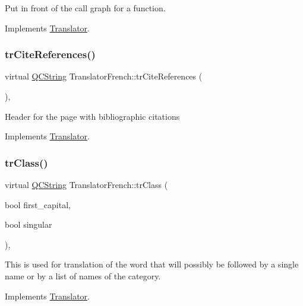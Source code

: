 Put in front of the call graph for a function. 

Implements \mbox{\hyperlink{class_translator}{Translator}}.

\mbox{\label{class_translator_french_a277ceee8799c14977e89df895b8b96ed}} 
\subsubsection{\texorpdfstring{trCiteReferences()}{trCiteReferences()}}
{\footnotesize\ttfamily virtual \mbox{\hyperlink{class_q_c_string}{Q\+C\+String}} Translator\+French\+::tr\+Cite\+References (\begin{DoxyParamCaption}{ }\end{DoxyParamCaption})\hspace{0.3cm}{\ttfamily [inline]}, {\ttfamily [virtual]}}

Header for the page with bibliographic citations 

Implements \mbox{\hyperlink{class_translator}{Translator}}.

\mbox{\label{class_translator_french_ada2dcb83abc801464809f6b1c4e16822}} 
\subsubsection{\texorpdfstring{trClass()}{trClass()}}
{\footnotesize\ttfamily virtual \mbox{\hyperlink{class_q_c_string}{Q\+C\+String}} Translator\+French\+::tr\+Class (\begin{DoxyParamCaption}\item[{bool}]{first\+\_\+capital,  }\item[{bool}]{singular }\end{DoxyParamCaption})\hspace{0.3cm}{\ttfamily [inline]}, {\ttfamily [virtual]}}

This is used for translation of the word that will possibly be followed by a single name or by a list of names of the category. 

Implements \mbox{\hyperlink{class_translator}{Translator}}.

\mbox{\label{class_translator_french_af91346d6052cacca65c5daf669d08b0b}} 

